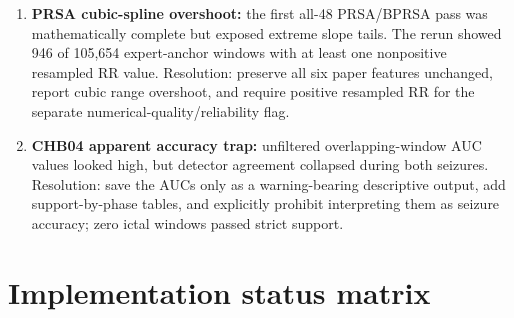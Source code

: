 \documentclass[11pt,a4paper]{article}
\begin{document}
\begin{enumerate}
  \item \textbf{PRSA cubic-spline overshoot:} the first all-48 PRSA/BPRSA pass was mathematically complete but exposed extreme slope tails. The rerun showed 946 of 105,654 expert-anchor windows with at least one nonpositive resampled RR value. Resolution: preserve all six paper features unchanged, report cubic range overshoot, and require positive resampled RR for the separate numerical-quality/reliability flag.
  \item \textbf{CHB04 apparent accuracy trap:} unfiltered overlapping-window AUC values looked high, but detector agreement collapsed during both seizures. Resolution: save the AUCs only as a warning-bearing descriptive output, add support-by-phase tables, and explicitly prohibit interpreting them as seizure accuracy; zero ictal windows passed strict support.
\end{enumerate}

\section{Implementation status matrix}
\label{sec:status}
\end{document}
